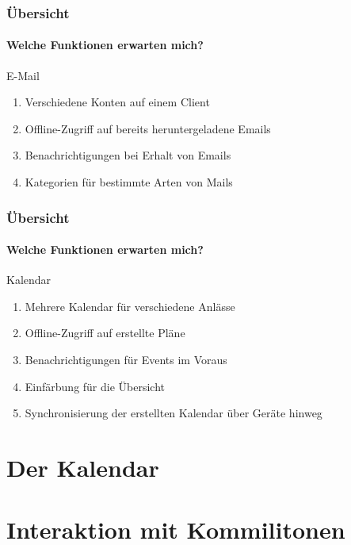 \documentclass[usenames,dvipsnames,10pt]{beamer}
\begin{document}
\begin{frame} 
    
    \frametitle{Übersicht} 
    \framesubtitle{Welche Funktionen erwarten mich?}
    \begin{block}{E-Mail}
        \begin{enumerate}
            \item Verschiedene Konten auf einem Client
            \item Offline-Zugriff auf bereits heruntergeladene Emails
            \item Benachrichtigungen bei Erhalt von Emails
            \item Kategorien für bestimmte Arten von Mails
        \end{enumerate}
    \end{block} 
    
\end{frame}
\begin{frame} 
    
    \frametitle{Übersicht} 
    \framesubtitle{Welche Funktionen erwarten mich?}
    \begin{block}{Kalendar}
        \begin{enumerate}
            \item Mehrere Kalendar für verschiedene Anlässe
            \item Offline-Zugriff auf erstellte Pläne
            \item Benachrichtigungen für Events im Voraus
            \item Einfärbung für die Übersicht
            \item Synchronisierung der erstellten Kalendar über Geräte hinweg
        \end{enumerate}
    \end{block} 
    
\end{frame}
\section{Der Kalendar}



\section{Interaktion mit Kommilitonen}
\end{document}
